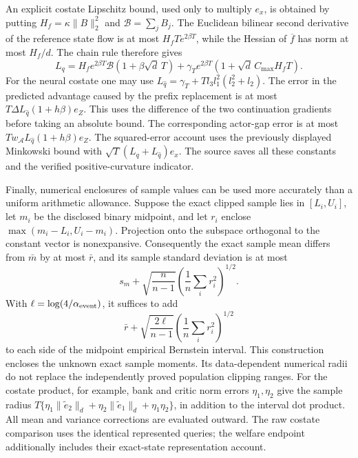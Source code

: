 An explicit costate Lipschitz bound, used only to multiply $e_x$, is
obtained by putting $H_f=\kappa\|B\|_2^2$ and
$\mathcal B=\sum_jB_j$. The Euclidean bilinear second derivative of
the reference state flow is at most $H_fTe^{2\beta T}$, while the
Hessian of $\overline{f}$ has norm at most $H_f/d$. The chain rule
therefore gives
\begin{equation}
 L_q=H_fe^{2\beta T}\mathcal B(1+\beta\sqrt d\,T)
       +\gamma_Te^{2\beta T}
                          (1+\sqrt d\,C_{\max}H_fT).
 \label{eq:r15qlipschitz}
\end{equation}
For the neural costate one may use
$L_{\widehat q}=\gamma_T+T l_3l_1^2(l_2^2+l_2)$.
The error in the predicted advantage caused by the prefix replacement
is at most
$T\Delta L_{\widehat q}(1+h\beta)e_Z$.
This uses the difference of the two continuation gradients before
taking an absolute bound. The corresponding actor-gap error is at
most $Tw_{\mathcal A}L_{\widehat q}(1+h\beta)e_Z$.
The squared-error account uses the previously displayed Minkowski
bound with $\sqrt T(L_q+L_{\widehat q})e_x$. The source saves all
these constants and the verified positive-curvature indicator.

Finally, numerical enclosures of sample values can be used more
accurately than a uniform arithmetic allowance. Suppose the exact
clipped sample lies in $[L_i,U_i]$, let $m_i$ be the disclosed binary
midpoint, and let $r_i$ enclose
$\max(m_i-L_i,U_i-m_i)$. Projection onto the subspace orthogonal to
the constant vector is nonexpansive. Consequently the exact sample
mean differs from $\bar m$ by at most $\bar r$, and its sample
standard deviation is at most
\[
 s_m+\sqrt{\frac{n}{n-1}}
                  \left(\frac1n\sum_i r_i^2\right)^{1/2}.
\]
With $\ell=\log(4/\alpha_{\rm event})$, it suffices to add
\[
 \bar r+\sqrt{\frac{2\ell}{n-1}}
                  \left(\frac1n\sum_i r_i^2\right)^{1/2}
\]
to each side of the midpoint empirical Bernstein interval. This
construction encloses the unknown exact sample moments. Its
data-dependent numerical radii do not replace the independently proved
population clipping ranges. For the costate product, for example, bank
and critic norm errors $\eta_1,\eta_2$ give the sample radius
$T\{\eta_1\|\widetilde e_2\|_d+
\eta_2\|\widetilde e_1\|_d+\eta_1\eta_2\}$, in addition to the
interval dot product. All mean and variance corrections are evaluated
outward. The raw costate comparison uses the identical represented
queries; the welfare endpoint additionally includes their
exact-state representation account.

